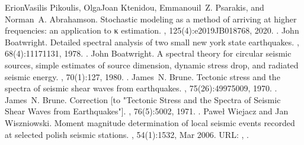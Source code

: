 \documentclass[letterpaper,10pt,english]{sphinxmanual}
\begin{document}
\begin{sphinxthebibliography}{1}
\sphinxAtStartPar
Erion\sphinxhyphen{}Vasilis Pikoulis, Olga\sphinxhyphen{}Joan Ktenidou, Emmanouil Z. Psarakis, and Norman A. Abrahamson. Stochastic modeling as a method of arriving at higher frequencies: an application to κ estimation. , 125(4):e2019JB018768, 2020. .
\sphinxAtStartPar
John Boatwright. Detailed spectral analysis of two small new york state earthquakes. , 68(4):1117\textendash{}1131, 1978. .
\sphinxAtStartPar
John Boatwright. A spectral theory for circular seismic sources, simple estimates of source dimension, dynamic stress drop, and radiated seismic energy. , 70(1):1\textendash{}27, 1980. .
\sphinxAtStartPar
James N. Brune. Tectonic stress and the spectra of seismic shear waves from earthquakes. , 75(26):4997\textendash{}5009, 1970. .
\sphinxAtStartPar
James N. Brune. Correction {[}to "Tectonic Stress and the Spectra of Seismic Shear Waves from Earthquakes"{]}. , 76(5):5002, 1971. .
\sphinxAtStartPar
Paweł Wiejacz and Jan Wiszniowski. Moment magnitude determination of local seismic events recorded at selected polish seismic stations. , 54(1):15\textendash{}32, Mar 2006. URL: , .
\end{sphinxthebibliography}
\end{document}
